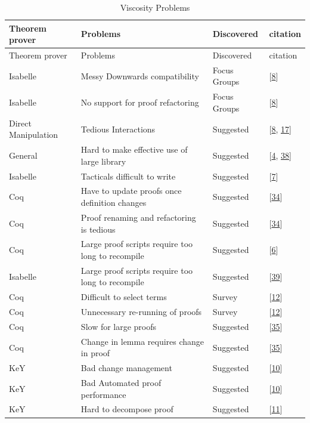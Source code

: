 \documentclass[
]{article}
\begin{document}
\begin{longtable}[]{@{}llll@{}}
\caption{\label{tbl:viscosity}Viscosity Problems}\tabularnewline
\toprule
Theorem prover & Problems & Discovered & citation \\
\midrule
\endfirsthead
\toprule
Theorem prover & Problems & Discovered & citation \\
\midrule
\endhead
Isabelle & Messy Downwards compatibility & Focus Groups &
{[}\protect\hyperlink{ref-beckert_usability_2015}{8}{]} \\
Isabelle & No support for proof refactoring & Focus Groups &
{[}\protect\hyperlink{ref-beckert_usability_2015}{8}{]} \\
Direct Manipulation & Tedious Interactions & Suggested &
{[}\protect\hyperlink{ref-beckert_usability_2015}{8},
\protect\hyperlink{ref-grebing_usability_2020}{17}{]} \\
General & Hard to make effective use of large library & Suggested &
{[}\protect\hyperlink{ref-asperti_considerations_2010}{4},
\protect\hyperlink{ref-tassi_interactive_2008}{38}{]} \\
Isabelle & Tacticals difficult to write & Suggested &
{[}\protect\hyperlink{ref-becker_lassie_2021}{7}{]} \\
Coq & Have to update proofs once definition changes & Suggested &
{[}\protect\hyperlink{ref-ringer_replica_2020}{34}{]} \\
Coq & Proof renaming and refactoring is tedious & Suggested &
{[}\protect\hyperlink{ref-ringer_replica_2020}{34}{]} \\
Coq & Large proof scripts require too long to recompile & Suggested &
{[}\protect\hyperlink{ref-barras_asynchronous_2015}{6}{]} \\
Isabelle & Large proof scripts require too long to recompile & Suggested
& {[}\protect\hyperlink{ref-wenzel_asynchronous_2014}{39}{]} \\
Coq & Difficult to select terms & Survey &
{[}\protect\hyperlink{ref-berman_development_2014}{12}{]} \\
Coq & Unnecessary re-running of proofs & Survey &
{[}\protect\hyperlink{ref-berman_development_2014}{12}{]} \\
Coq & Slow for large proofs & Suggested &
{[}\protect\hyperlink{ref-roe_coqpie_2016}{35}{]} \\
Coq & Change in lemma requires change in proof & Suggested &
{[}\protect\hyperlink{ref-roe_coqpie_2016}{35}{]} \\
KeY & Bad change management & Suggested &
{[}\protect\hyperlink{ref-beckert_evaluating_2012}{10}{]} \\
KeY & Bad Automated proof performance & Suggested &
{[}\protect\hyperlink{ref-beckert_evaluating_2012}{10}{]} \\
KeY & Hard to decompose proof & Suggested &
{[}\protect\hyperlink{ref-beckert_interactive_2015}{11}{]} \\
\bottomrule
\end{longtable}
\end{document}
